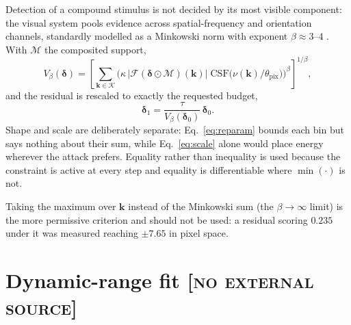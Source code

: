 \documentclass[11pt,a4paper]{article}
\newcommand{\novel}{\hfill{\normalfont\small\textsc{[no external source]}}}
\begin{document}
Detection of a compound stimulus is not decided by its most visible
component: the visual system pools evidence across spatial-frequency and
orientation channels, standardly modelled as a Minkowski norm with
exponent $\beta\approx3\text{--}4$
\citep{quick1974,robson1981,watson1979}. With $\mathcal{M}$ the
composited support,
\begin{equation}
  V_\beta(\boldsymbol{\delta})=
  \left[\sum_{\mathbf{k}\in\mathcal{K}}
  \Big(\kappa\,\big|\mathcal{F}(\boldsymbol{\delta}\odot\mathcal{M})(\mathbf{k})\big|\;
  \mathrm{CSF}\big(\nu(\mathbf{k})/\theta_{\mathrm{pix}}\big)\Big)^{\beta}
  \right]^{1/\beta},
  \label{eq:visibility}
\end{equation}
and the residual is rescaled to exactly the requested budget,
\begin{equation}
  \boldsymbol{\delta}_1=\frac{\tau}{V_\beta(\boldsymbol{\delta}_0)}\,
  \boldsymbol{\delta}_0 .
  \label{eq:scale}
\end{equation}
Shape and scale are deliberately separate: Eq.~\eqref{eq:reparam} bounds
each bin but says nothing about their sum, while Eq.~\eqref{eq:scale}
alone would place energy wherever the attack prefers. Equality rather
than inequality is used because the constraint is active at every step
and equality is differentiable where $\min(\cdot)$ is not.

Taking the maximum over $\mathbf{k}$ instead of the Minkowski sum
(the $\beta\to\infty$ limit) is the more permissive criterion and should
not be used: a residual scoring $0.235$ under it was measured reaching
$\pm7.65$ in pixel space.

\section{Dynamic-range fit \novel}
\end{document}
